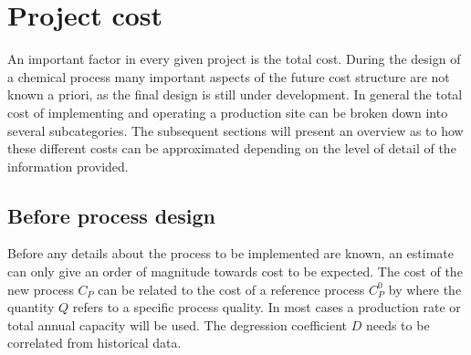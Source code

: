     \section{Project cost}
    \label{sec:ProjectCost}

    An important factor in every given project is the total cost. During the design of a chemical process many
    important aspects of the future cost structure are not known a priori, as the final design is still under development.
    In general the total cost of implementing and operating a production site can be broken down into
    several subcategories.
    The subsequent sections will present an overview as to how these different costs can be approximated
    depending on the level of detail of the information provided.

        \subsection{Before process design}
        \label{sec:before}
        Before any details about the process to be implemented are known, an estimate can only give an
        order of magnitude towards cost to be expected. The cost of the new process $C_P$ can be
        related to the cost of a reference process $C_{P}^0$ by
        where the quantity $Q$ refers to a specific process quality. In most cases a production rate or total
        annual capacity will be used. The degression coefficient $D$ needs to be correlated from historical data.

